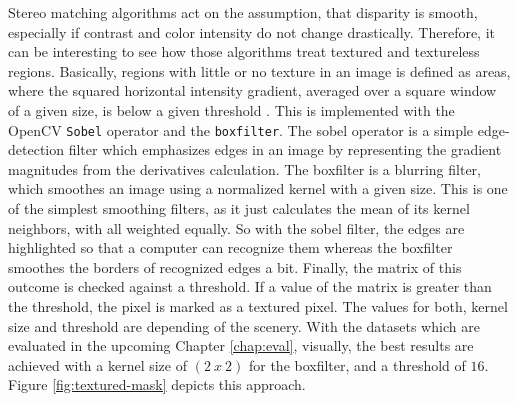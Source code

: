 Stereo matching algorithms act on the assumption, that disparity is smooth, especially if contrast and color intensity do not change drastically.
Therefore, it can be interesting to see how those algorithms treat textured and textureless regions.
Basically, regions with little or no texture in an image is defined as areas, where the squared horizontal intensity gradient, averaged over a square window of a given size, is below a given threshold \citep{scharstein2002taxonomy, cyganek2011introduction}.
\newline\newline\noindent This is implemented with the OpenCV \texttt{Sobel} operator and the \texttt{boxfilter}.
The sobel operator is a simple edge-detection filter which emphasizes edges in an image by representing the gradient magnitudes from the derivatives calculation.
The boxfilter is a blurring filter, which smoothes an image using a normalized kernel with a given size.
This is one of the simplest smoothing filters, as it just calculates the mean of its kernel neighbors, with all weighted equally.
So with the sobel filter, the edges are highlighted so that a computer can recognize them whereas the boxfilter smoothes the borders of recognized edges a bit.
Finally, the matrix of this outcome is checked against a threshold.
If a value of the matrix is greater than the threshold, the pixel is marked as a textured pixel.
\newline\newline\noindent The values for both, kernel size and threshold are depending of the scenery.
With the datasets which are evaluated in the upcoming Chapter \ref{chap:eval}, visually, the best results are achieved with a kernel size of $(2\ x\ 2)$ for the boxfilter, and a threshold of $16$.
Figure \ref{fig:textured-mask} depicts this approach.


